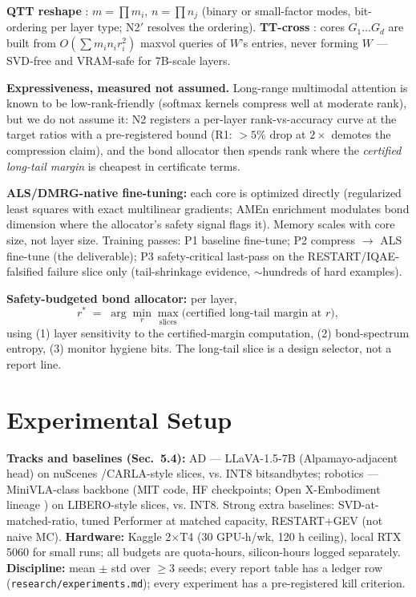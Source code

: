 \documentclass[conference,10pt]{IEEEtran}
\begin{document}
\textbf{QTT reshape} \cite{qtt}: $m=\prod m_i$, $n=\prod n_j$ (binary or
small-factor modes, bit-ordering per layer type; N2$'$ resolves the ordering).
\textbf{TT-cross} \cite{tt,ttopt}: cores $G_1\dots G_d$ are built from
$O(\sum m_i n_i r_i^2)$ maxvol queries of $W$'s entries, never forming $W$ ---
SVD-free and VRAM-safe for 7B-scale layers.

\textbf{Expressiveness, measured not assumed.} Long-range multimodal attention
is known to be low-rank-friendly (softmax kernels compress well at moderate
rank), but we do not assume it: N2 registers a per-layer rank-vs-accuracy curve
at the target ratios with a pre-registered bound (R1: $>5\%$ drop at $2\times$
demotes the compression claim), and the bond allocator then spends rank where
the \emph{certified long-tail margin} is cheapest in certificate terms.

\textbf{ALS/DMRG-native fine-tuning:} each core is optimized directly
(regularized least squares with exact multilinear gradients; AMEn enrichment
modulates bond dimension where the allocator's safety signal flags it). Memory
scales with core size, not layer size. Training passes: P1 baseline fine-tune;
P2 compress $\rightarrow$ ALS fine-tune (the deliverable); P3 safety-critical
last-pass on the RESTART/IQAE-falsified failure slice only (tail-shrinkage
evidence, $\sim$hundreds of hard examples).

\textbf{Safety-budgeted bond allocator:} per layer,
\begin{equation}
r^* \;=\; \arg\min_r \max_{\text{slices}} \big( \text{certified long-tail margin at } r \big),
\end{equation}
using (1) layer sensitivity to the certified-margin computation, (2) bond-spectrum
entropy, (3) monitor hygiene bits. The long-tail slice is a design selector, not
a report line.

\section{Experimental Setup}
\label{sec:setup}

\textbf{Tracks and baselines (Sec.~5.4):} AD --- LLaVA-1.5-7B (Alpamayo-adjacent
head) on nuScenes \cite{nuScenes}/CARLA-style slices, vs. INT8 bitsandbytes;
robotics --- MiniVLA-class backbone (MIT code, HF checkpoints; Open
X-Embodiment lineage \cite{oxe}) on LIBERO-style slices, vs.
INT8. Strong extra baselines: SVD-at-matched-ratio, tuned Performer at matched
capacity, RESTART+GEV (not naive MC). \textbf{Hardware:} Kaggle 2$\times$T4
(30 GPU-h/wk, 120 h ceiling), local RTX 5060 for small runs; all budgets are
quota-hours, silicon-hours logged separately. \textbf{Discipline:} mean $\pm$ std
over $\ge$3 seeds; every report table has a ledger row
(\texttt{research/experiments.md}); every experiment has a pre-registered kill
criterion.
\end{document}
